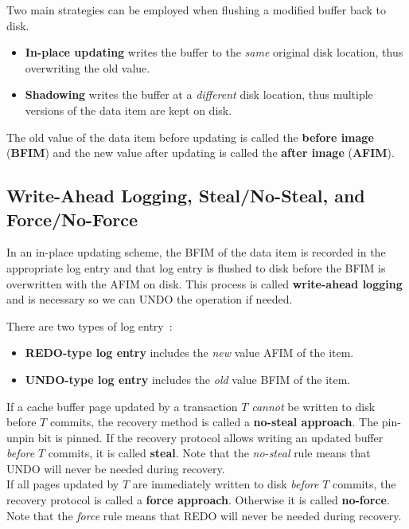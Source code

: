 Two main strategies can be employed when flushing a modified buffer back to disk.

\begin{itemize}
    \item \textbf{In-place updating} writes the buffer to the \textit{same} original disk location, thus overwriting the old value.
    \item \textbf{Shadowing} writes the buffer at a \textit{different} disk location, thus multiple versions of the data item are kept on disk.
\end{itemize}

The old value of the data item before updating is called the \textbf{before image} (\textbf{BFIM}) and the new value after updating is called the \textbf{after image} (\textbf{AFIM}).


\subsection{Write-Ahead Logging, Steal/No-Steal, and Force/No-Force}
In an in-place updating scheme, the BFIM of the data item is recorded in the appropriate log entry and that log entry is flushed to disk before the BFIM is overwritten with the AFIM on disk. This process is called \textbf{write-ahead logging} and is necessary so we can UNDO the operation if needed. \\

\begin{samepage}
There are two types of log entry~:

\begin{itemize}
    \item \textbf{REDO-type log entry} includes the \textit{new} value AFIM of the item.
    \item \textbf{UNDO-type log entry} includes the \textit{old} value BFIM of the item.
\end{itemize}
\end{samepage}

If a cache buffer page updated by a transaction $T$ \textit{cannot} be written to disk before $T$ commits, the recovery method is called a \textbf{no-steal approach}. The pin-unpin bit is pinned. If the recovery protocol allows writing an updated buffer \textit{before} $T$ commits, it is called \textbf{steal}. Note that the \textit{no-steal} rule means that UNDO will never be needed during recovery. \\

If all pages updated by $T$ are immediately written to disk \textit{before} $T$ commits, the recovery protocol is called a \textbf{force approach}. Otherwise it is called \textbf{no-force}. Note that the \textit{force} rule means that REDO will never be needed during recovery. \\

